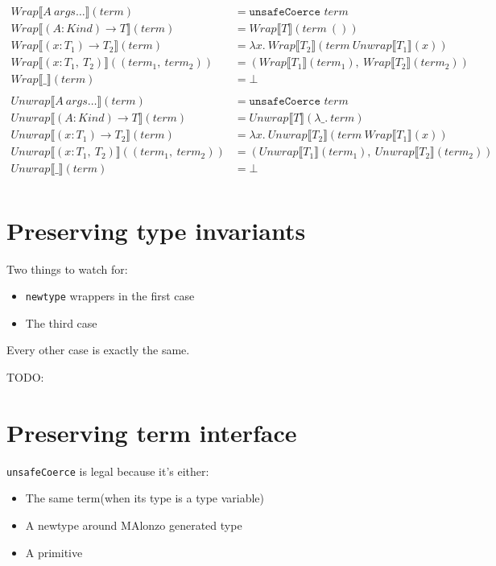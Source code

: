 \begin{align*}
   Wrap\llbracket A\ args\ldots \rrbracket(term) &= \texttt{unsafeCoerce } term\\
   Wrap\llbracket (A : Kind) \rightarrow T \rrbracket(term) &= Wrap\llbracket T \rrbracket(term\ ())\\
   Wrap\llbracket (x : T_1) \rightarrow T_2 \rrbracket(term) &=
      \lambda x.\ Wrap\llbracket T_2 \rrbracket(term\ Unwrap\llbracket T_1 \rrbracket(x))\\
   Wrap\llbracket (x : T_1,\ T_2) \rrbracket((term_1,\ term_2)) &=
      (Wrap\llbracket T_1 \rrbracket(term_1),\ Wrap\llbracket T_2 \rrbracket(term_2))\\
   Wrap\llbracket \_ \rrbracket(term) &= \bot\\
   \\
   Unwrap\llbracket A\ args\ldots \rrbracket(term) &= \texttt{unsafeCoerce } term\\
   Unwrap\llbracket (A : Kind) \rightarrow T \rrbracket(term) &= Unwrap\llbracket T \rrbracket(\lambda \_.\ term)\\
   Unwrap\llbracket (x : T_1) \rightarrow T_2 \rrbracket(term) &=
      \lambda x.\ Unwrap\llbracket T_2 \rrbracket(term\ Wrap\llbracket T_1 \rrbracket(x))\\
   Unwrap\llbracket (x : T_1,\ T_2) \rrbracket((term_1,\ term_2)) &=
      (Unwrap\llbracket T_1 \rrbracket(term_1),\ Unwrap\llbracket T_2 \rrbracket(term_2))\\
   Unwrap\llbracket \_ \rrbracket(term) &= \bot\\
\end{align*}

\section{Preserving type invariants}

Two things to watch for:
\begin{itemize}
\item \texttt{newtype} wrappers in the first case
\item The third case
\end{itemize}
Every other case is exactly the same.

TODO:

\section{Preserving term interface}


\texttt{unsafeCoerce} is legal because it's either:
\begin{itemize}
\item The same term(when its type is a type variable)
\item A newtype around MAlonzo generated type
\item A primitive
\end{itemize}
